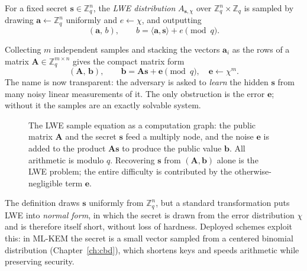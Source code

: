 \begin{definition}
For a fixed secret $\mathbf{s}\in\mathbb{Z}_q^{n}$, the \emph{LWE distribution} $A_{\mathbf{s},\chi}$ over $\mathbb{Z}_q^{n}\times\mathbb{Z}_q$ is sampled by drawing $\mathbf{a}\leftarrow\mathbb{Z}_q^{n}$ uniformly and $e\leftarrow\chi$, and outputting
\[
(\mathbf{a},\,b), \qquad b=\langle \mathbf{a},\mathbf{s}\rangle + e \pmod q.
\]
\end{definition}

Collecting $m$ independent samples and stacking the vectors $\mathbf{a}_i$ as the rows of a matrix $\mathbf{A}\in\mathbb{Z}_q^{m\times n}$ gives the compact matrix form
\[
(\mathbf{A},\,\mathbf{b}), \qquad \mathbf{b}=\mathbf{A}\mathbf{s}+\mathbf{e}\pmod q,\quad \mathbf{e}\leftarrow\chi^{m}.
\]
The name is now transparent: the adversary is asked to \emph{learn} the hidden $\mathbf{s}$ from many noisy linear measurements of it. The only obstruction is the error $\mathbf{e}$; without it the samples are an exactly solvable system.

\begin{figure}[H]
\centering
{}
\caption{The LWE sample equation as a computation graph: the public matrix $\mathbf{A}$ and the secret $\mathbf{s}$ feed a multiply node, and the noise $\mathbf{e}$ is added to the product $\mathbf{A}\mathbf{s}$ to produce the public value $\mathbf{b}$. All arithmetic is modulo $q$. Recovering $\mathbf{s}$ from $(\mathbf{A},\mathbf{b})$ alone is the LWE problem; the entire difficulty is contributed by the otherwise-negligible term $\mathbf{e}$.}
\label{fig:lwe-equation-boxes}
\end{figure}

\begin{remark}
The definition draws $\mathbf{s}$ uniformly from $\mathbb{Z}_q^{n}$, but a standard transformation puts LWE into \emph{normal form}, in which the secret is drawn from the error distribution $\chi$ and is therefore itself short, without loss of hardness. Deployed schemes exploit this: in ML-KEM the secret is a small vector sampled from a centered binomial distribution (Chapter~\ref{ch:cbd}), which shortens keys and speeds arithmetic while preserving security.
\end{remark}

